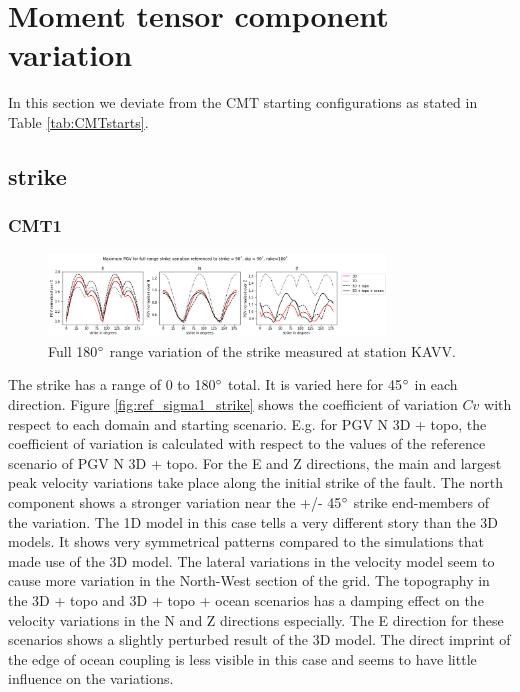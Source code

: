 \documentclass[../Text/00main.tex]{subfiles}
\begin{document}
\FloatBarrier

\section{Moment tensor component variation}

In this section we deviate from the CMT starting configurations as stated in Table \ref{tab:CMTstarts}. 

\subsection{strike}

\subsubsection{CMT1}

\begin{figure}[!htb]
    \centering
    \includegraphics[width=0.8\textwidth]{images_results/fullrange1_strikevar_maxvals.png}
    \caption{Full 180$\degree$ range variation of the strike measured at station KAVV.}
    \label{fig:KAVV_fullrange_1}
\end{figure}

The strike has a range of 0 to 180$\degree$ total. It is varied here for 45$\degree$ in each direction. Figure \ref{fig:ref_sigma1_strike} shows the coefficient of variation $Cv$ with respect to each domain and starting scenario. E.g. for PGV N 3D + topo, the coefficient of variation is calculated with respect to the values of the reference scenario of PGV N 3D + topo. For the E and Z directions, the main and largest peak velocity variations take place along the initial strike of the fault. The north component shows a stronger variation near the +/- 45$\degree$ strike end-members of the variation. The 1D model in this case tells a very different story than the 3D models. It shows very symmetrical patterns compared to the simulations that made use of the 3D model. The lateral variations in the velocity model seem to cause more variation in the North-West section of the grid. The topography in the 3D + topo and 3D + topo + ocean scenarios has a damping effect on the velocity variations in the N and Z directions especially. The E direction for these scenarios shows a slightly perturbed result of the 3D model. The direct imprint of the edge of ocean coupling is less visible in this case and seems to have little influence on the variations. 
\end{document}
